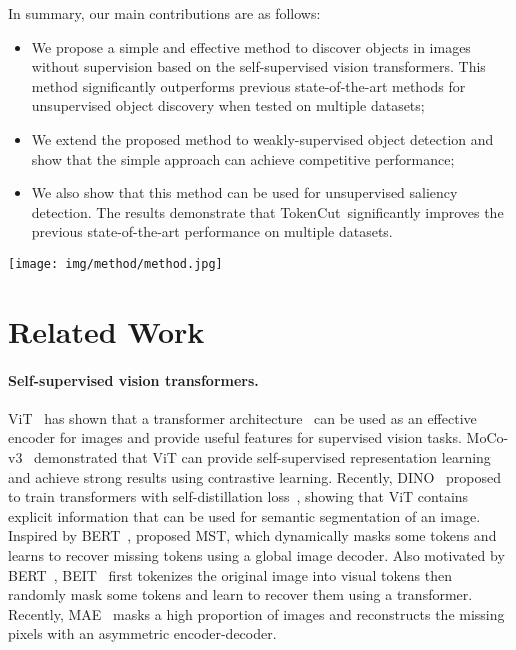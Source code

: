 \documentclass[twocolumn]{article}
\newenvironment{Itemize}{
\setlength{\leftmargini}{9pt}\begin{itemize}\setlength{\itemsep}{0pt}\setlength{\topsep}{0pt}\setlength{\partopsep}{0pt}\setlength{\parskip}{0pt}}{\end{itemize}}
\newcommand{\name} {TokenCut}
\begin{document}
In summary, our main contributions are as follows:
\begin{Itemize}


\item We propose a simple and effective method to discover objects in images without supervision based on the self-supervised vision transformers. This method significantly outperforms previous state-of-the-art methods for unsupervised object discovery when tested on multiple datasets;

\item We extend the proposed method to weakly-supervised object detection and show that the simple approach can achieve competitive performance;

\item We also show that this method can be used for unsupervised saliency detection. The results demonstrate that \name~significantly improves the previous state-of-the-art performance on multiple datasets.

\end{Itemize}


\begin{figure*}[!thbp]
	\centering
	\texttt{[image: img/method/method.jpg]}
	\caption{An overview of the TokenCut approach. We construct a graph where the nodes are tokens and the edges are similarities between the tokens using transformer features. The foreground and background segmentation can be solved by Ncut~\cite{shi2000normalized}. Performing bi-partition on the second smallest eigenvector allows to detect foreground object.}
	\label{fig:method}	
\end{figure*}
\section{Related Work}
\paragraph{Self-supervised vision transformers.} ViT~\cite{dosovitskiy2020image} has shown that a transformer architecture~\cite{vaswani2017attention} can be used as an effective encoder for images and provide useful features for supervised vision tasks.  
MoCo-v3~\cite{chen2021empirical} demonstrated that ViT can provide self-supervised representation learning and achieve strong results using contrastive learning. 
Recently, DINO~\cite{caron2021emerging} proposed to train  transformers  with self-distillation loss~\cite{hinton2015distilling}, showing that ViT contains explicit information that can be used for semantic segmentation of an image.
Inspired by BERT~\cite{devlin2018bert}, \cite{li2021mst} proposed MST, which dynamically masks some tokens and learns to recover missing tokens using a global image decoder. Also motivated by BERT~\cite{devlin2018bert}, BEIT~\cite{bao2021beit} first tokenizes the original image into visual tokens then randomly mask some tokens and learn to recover them using a transformer. Recently, MAE~\cite{he2021masked} masks a high proportion of images and reconstructs the missing pixels with an asymmetric encoder-decoder. 
\end{document}
